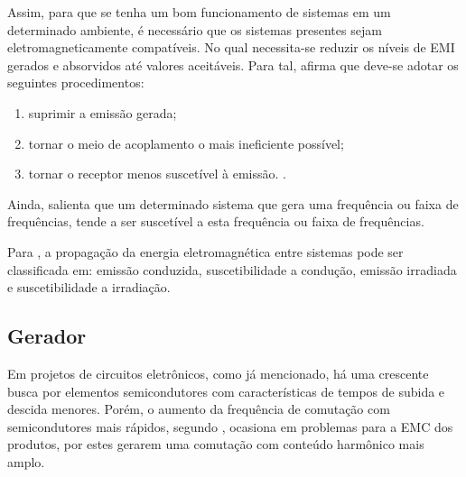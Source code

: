     Assim, para que se tenha um bom funcionamento de sistemas em um determinado ambiente, é necessário que os sistemas presentes sejam eletromagneticamente compatíveis. No qual necessita-se reduzir os níveis de EMI gerados e absorvidos até valores aceitáveis. Para tal,  afirma que deve-se adotar os seguintes procedimentos: 
    
    \begin{citacao}
        \begin{enumerate}[leftmargin=\leftskip+\labelwidth-\labelsep]
            \item suprimir a emissão gerada;
            \item tornar o meio de acoplamento o mais ineficiente possível;
            \item tornar o receptor menos suscetível à emissão. \cite[p.~4, tradução nossa]{ref:EMC_livro_Paul}.
        \end{enumerate}
    \end{citacao}
    
    Ainda,  salienta que um determinado sistema que gera uma frequência ou faixa de frequências, tende a ser suscetível a esta frequência ou faixa de frequências.
    
    Para , a propagação da energia eletromagnética entre sistemas pode ser classificada em: emissão conduzida, suscetibilidade a condução, emissão irradiada e suscetibilidade a irradiação.
    
    
        \subsection{Gerador} \label{cap:fund_emc_gen}
        
        Em projetos de circuitos eletrônicos, como já mencionado, há uma crescente busca por elementos semicondutores com características de tempos de subida e descida menores. Porém, o aumento da frequência de comutação com semicondutores mais rápidos, segundo , ocasiona em problemas para a EMC dos produtos, por estes gerarem uma comutação com conteúdo harmônico mais amplo.
        
